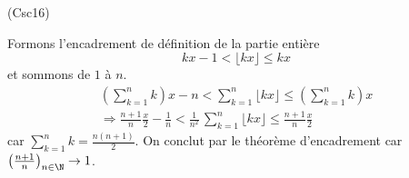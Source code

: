 \begin{tiny}(Csc16)\end{tiny} Formons l'encadrement de définition de la partie entière
\[
  kx - 1 < \lfloor kx \rfloor \leq kx
\]
et sommons de $1$ à $n$.
\begin{multline*}
  \left( \sum_{k=1}^{n} k\right) x - n < \sum_{k=1}^{n} \lfloor kx \rfloor 
  \leq \left( \sum_{k=1}^{n} k\right) x \\
  \Rightarrow
  \frac{n+1}{n} \frac{x}{2} - \frac{1}{n} < \frac{1}{n^2}\,\sum_{k=1}^{n} \lfloor kx \rfloor \leq \frac{n+1}{n} \frac{x}{2}
\end{multline*}
car $\sum_{k=1}^{n} k = \frac{n(n+1)}{2}$. On conclut par le théorème d'encadrement car $\left( \frac{n+1}{n}\right)_{n\in \N}\rightarrow 1$.
